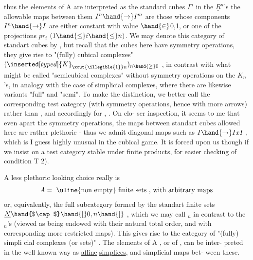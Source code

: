 thus the elements of A are interpreted as the standard cubes $I^n$ in the $\underline{R}^{n}$'s
the allowable maps between them $I^n \hand{\to} I^m$ are those whose components $I^n \hand{\to} I$
are either constant with value $\hand{\in}$\hand{\{}0,1\hand{\}}, or one of the projections $pr_i$ \xout{(}
$(1 \hand{\leq} i \hand{\leq} n)$. We may denote this category of standart cubes by \hand{$\square$} , but
recall that  the cubes here have symmetry operations, they give
rise to  "(fully) cubical complexes" $(\inserted[typed]{K}_{\xout{\illegible{1}}n})_{n \hand{\geq} 0}$ , in contrast with what
might be called "semicubical complexes" without symmetry operations on the
$K_n$'s, in analogy with the case of simplicial complexes, where there are
likewise variants "full" and "semi". To make the distinction, we better
call the corresponding test category (with symmetry operations, hence
with more arrows) \hand{$\tilde{\square}$} rather than \hand{$\square$} , and accordingly for \hand{$\tilde{\Delta}$}, \hand{$\Delta$} . On clo-%
ser inspection, it seems to me that even apart the symmetry operations,
the maps between standart cubes allowed here are rather plethoric - thus
we admit diagonal maps such as $I \hand{\to} IxI$ , which is I guess highly unusual
in the cubical game. It is forced upon us though if we insist on a test
category stable under finite products, for easier checking of condition
T 2).

A less plethoric looking choice really is
\[ A = \text{ \uline{non empty} finite sets , with arbitrary maps} \]
or, equivalently, the full subcategory \inserted{$\tilde{\Delta}$} formed by the standart finite sets
$\underline{N}\hand{$\cap$}\hand{[}0,n\hand{]}$ , which we may call \hand{$\tilde{\Delta}$}$_n$ in contrast to the  \hand{$\Delta$}$_n$'s (viewed as
being endowed with their natural total order, and with corresponding more
restricted maps). This gives rise to the category \hand{$\tilde{\Delta}^{\wedge}$} of "(fully) simpli%
cial complexes (or sets)" . The elements of A , or of \hand{$\tilde{\Delta}$} , can be inter-%
preted in the well known way as \uline{affine} \uline{simplices}, and simplicial maps bet-%
ween these.

